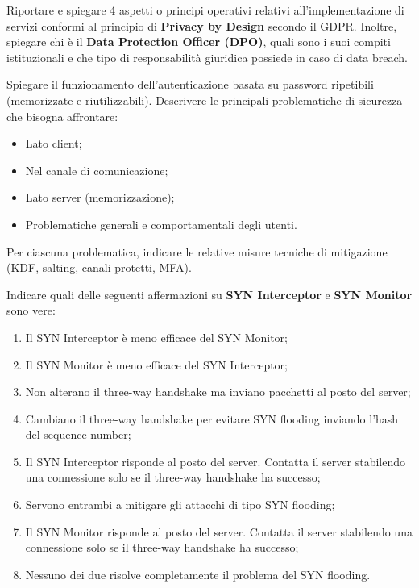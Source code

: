 \documentclass[11pt,a4paper]{article}
\begin{document}
\begin{questionbox}
Riportare e spiegare 4 aspetti o principi operativi relativi all'implementazione di servizi conformi al principio di \textbf{Privacy by Design} secondo il GDPR.
Inoltre, spiegare chi \`e il \textbf{Data Protection Officer (DPO)}, quali sono i suoi compiti istituzionali e che tipo di responsabilit\`a giuridica possiede in caso di data breach.
\end{questionbox}

\begin{questionbox}
Spiegare il funzionamento dell'autenticazione basata su password ripetibili (memorizzate e riutilizzabili).
Descrivere le principali problematiche di sicurezza che bisogna affrontare:
\begin{itemize}
    \item Lato client;
    \item Nel canale di comunicazione;
    \item Lato server (memorizzazione);
    \item Problematiche generali e comportamentali degli utenti.
\end{itemize}
Per ciascuna problematica, indicare le relative misure tecniche di mitigazione (KDF, salting, canali protetti, MFA).
\end{questionbox}

\begin{questionbox}
Indicare quali delle seguenti affermazioni su \textbf{SYN Interceptor} e \textbf{SYN Monitor} sono vere:
\begin{enumerate}[label=\alph*.]
    \item Il SYN Interceptor \`e meno efficace del SYN Monitor;
    \item Il SYN Monitor \`e meno efficace del SYN Interceptor;
    \item Non alterano il three-way handshake ma inviano pacchetti al posto del server;
    \item Cambiano il three-way handshake per evitare SYN flooding inviando l'hash del sequence number;
    \item Il SYN Interceptor risponde al posto del server. Contatta il server stabilendo una connessione solo se il three-way handshake ha successo;
    \item Servono entrambi a mitigare gli attacchi di tipo SYN flooding;
    \item Il SYN Monitor risponde al posto del server. Contatta il server stabilendo una connessione solo se il three-way handshake ha successo;
    \item Nessuno dei due risolve completamente il problema del SYN flooding.
\end{enumerate}
\end{questionbox}
\end{document}
